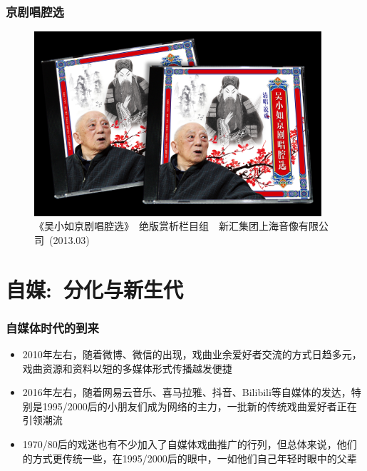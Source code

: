 \documentclass[cjk,slidestop,compress,mathserif,blue]{beamer}
\begin{document}
\frame
{
	\frametitle{京剧唱腔选}
\begin{figure}[h!]
\centering
\vspace{-10.5pt}
\includegraphics[height=0.65\textwidth,width=0.95\textwidth,viewport=0 0 680 450,clip]{Figures_Peking-Opera/Wu_CD.jpg}
\caption{\fontsize{6.1pt}{3.9pt}\selectfont\textrm{《吴小如京剧唱腔选》~绝版赏析栏目组~~新汇集团上海音像有限公司~(2013.03)}}
\label{Peking_Opera_CD-2012}
\end{figure}
}

\section{自媒:~分化与新生代}
\frame
{
	\frametitle{自媒体时代的到来}
	\begin{itemize}
                \setlength{\itemsep}{20pt}
		\item \textrm{2010}年左右，随着微博、微信的出现，戏曲业余爱好者交流的方式日趋多元，戏曲资源和资料以短的多媒体形式传播越发便捷
		\item \textrm{2016}年左右，随着网易云音乐、喜马拉雅、抖音、\textrm{Bilibili}等自媒体的发达，特别是\textrm{1995/2000}后的小朋友们成为网络的主力，一批新的传统戏曲爱好者正在引领潮流
		\item \textrm{1970/80}后的戏迷也有不少加入了自媒体戏曲推广的行列，但总体来说，他们的方式更传统一些，在\textrm{1995/2000}后的眼中，一如他们自己年轻时眼中的父辈
	\end{itemize}
}
\end{document}
